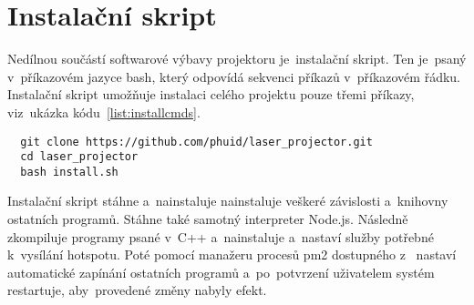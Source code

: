 





\section{Instalační skript}
Nedílnou součástí softwarové výbavy projektoru je~instalační skript.
Ten je~psaný v~příkazovém jazyce bash, který odpovídá sekvenci příkazů v~příkazovém řádku.
Instalační skript umožňuje instalaci celého projektu pouze třemi příkazy, viz~ukázka kódu~\ref{list:installcmds}.

\begin{code}
\begin{verbatim}
  git clone https://github.com/phuid/laser_projector.git
  cd laser_projector
  bash install.sh
\end{verbatim}
\end{code}

Instalační skript stáhne a~nainstaluje nainstaluje veškeré závislosti a~knihovny ostatních programů. Stáhne také samotný interpreter Node.js.
Následně zkompiluje programy psané v~C++ a~nainstaluje a~nastaví služby potřebné k~vysílání hotspotu. Poté pomocí manažeru procesů pm2 dostupného z~\cite{pm2} nastaví automatické zapínání ostatních programů a~po~potvrzení uživatelem systém restartuje, aby~provedené změny nabyly efekt.
